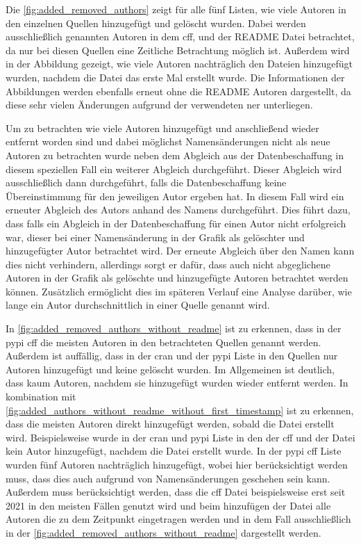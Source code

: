 Die \autoref{fig:added_removed_authors} zeigt für alle fünf Listen, wie viele Autoren in den einzelnen Quellen hinzugefügt und gelöscht wurden.
Dabei werden ausschließlich genannten Autoren in dem \gls{cff},  und der README Datei betrachtet, da nur bei diesen Quellen eine Zeitliche Betrachtung möglich ist.
Außerdem wird in der Abbildung gezeigt, wie viele Autoren nachträglich den Dateien hinzugefügt wurden, nachdem die Datei das erste Mal erstellt wurde.
Die Informationen der Abbildungen werden ebenfalls erneut ohne die README Autoren dargestellt, da diese sehr vielen Änderungen aufgrund der verwendeten \gls{ner} unterliegen.

Um zu betrachten wie viele Autoren hinzugefügt und anschließend wieder entfernt worden sind und dabei möglichst Namensänderungen nicht als neue Autoren zu betrachten wurde neben dem Abgleich aus der Datenbeschaffung in diesem speziellen Fall ein weiterer Abgleich durchgeführt.
Dieser Abgleich wird ausschließlich dann durchgeführt, falls die Datenbeschaffung keine Übereinstimmung für den jeweiligen Autor ergeben hat.
In diesem Fall wird ein erneuter Abgleich des Autors anhand des Namens durchgeführt.
Dies führt dazu, dass falls ein Abgleich in der Datenbeschaffung für einen Autor nicht erfolgreich war, dieser bei einer Namensänderung in der Grafik als gelöschter und hinzugefügter Autor betrachtet wird.
Der erneute Abgleich über den Namen kann dies nicht verhindern, allerdings sorgt er dafür, dass auch nicht abgeglichene Autoren in der Grafik als gelöschte und hinzugefügte Autoren betrachtet werden können.
Zusätzlich ermöglicht dies im späteren Verlauf eine Analyse darüber, wie lange ein Autor durchschnittlich in einer Quelle genannt wird.

In \autoref{fig:added_removed_authors_without_readme} ist zu erkennen, dass in der \gls{pypi} \gls{cff} die meisten Autoren in den betrachteten Quellen genannt werden.
Außerdem ist auffällig, dass in der \gls{cran} und der \gls{pypi} Liste in den Quellen nur Autoren hinzugefügt und keine gelöscht wurden.
Im Allgemeinen ist deutlich, dass kaum Autoren, nachdem sie hinzugefügt wurden wieder entfernt werden.
In kombination mit \autoref{fig:added_authors_without_readme_without_first_timestamp} ist zu erkennen, dass die meisten Autoren direkt hinzugefügt werden, sobald die Datei erstellt wird.
Beispielsweise wurde in der \gls{cran} und \gls{pypi} Liste in den der \gls{cff} und der  Datei kein Autor hinzugefügt, nachdem die Datei erstellt wurde.
In der \gls{pypi} \gls{cff} Liste wurden fünf Autoren nachträglich hinzugefügt, wobei hier berücksichtigt werden muss, dass dies auch aufgrund von Namensänderungen geschehen sein kann.
Außerdem muss berücksichtigt werden, dass die \gls{cff} Datei beispielsweise erst seit 2021 in den meisten Fällen genutzt wird und beim hinzufügen der Datei alle Autoren die zu dem Zeitpunkt eingetragen werden und in dem Fall ausschließlich in der \autoref{fig:added_removed_authors_without_readme} dargestellt werden.

